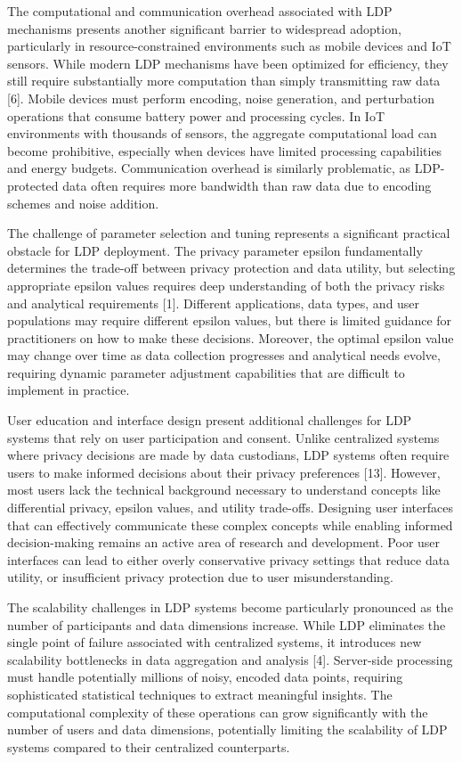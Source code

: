 \documentclass[conference]{IEEEtran}
\begin{document}
The computational and communication overhead associated with LDP mechanisms presents another significant barrier to widespread adoption, particularly in resource-constrained environments such as mobile devices and IoT sensors. While modern LDP mechanisms have been optimized for efficiency, they still require substantially more computation than simply transmitting raw data [6]. Mobile devices must perform encoding, noise generation, and perturbation operations that consume battery power and processing cycles. In IoT environments with thousands of sensors, the aggregate computational load can become prohibitive, especially when devices have limited processing capabilities and energy budgets. Communication overhead is similarly problematic, as LDP-protected data often requires more bandwidth than raw data due to encoding schemes and noise addition.

The challenge of parameter selection and tuning represents a significant practical obstacle for LDP deployment. The privacy parameter epsilon fundamentally determines the trade-off between privacy protection and data utility, but selecting appropriate epsilon values requires deep understanding of both the privacy risks and analytical requirements [1]. Different applications, data types, and user populations may require different epsilon values, but there is limited guidance for practitioners on how to make these decisions. Moreover, the optimal epsilon value may change over time as data collection progresses and analytical needs evolve, requiring dynamic parameter adjustment capabilities that are difficult to implement in practice.

User education and interface design present additional challenges for LDP systems that rely on user participation and consent. Unlike centralized systems where privacy decisions are made by data custodians, LDP systems often require users to make informed decisions about their privacy preferences [13]. However, most users lack the technical background necessary to understand concepts like differential privacy, epsilon values, and utility trade-offs. Designing user interfaces that can effectively communicate these complex concepts while enabling informed decision-making remains an active area of research and development. Poor user interfaces can lead to either overly conservative privacy settings that reduce data utility, or insufficient privacy protection due to user misunderstanding.

The scalability challenges in LDP systems become particularly pronounced as the number of participants and data dimensions increase. While LDP eliminates the single point of failure associated with centralized systems, it introduces new scalability bottlenecks in data aggregation and analysis [4]. Server-side processing must handle potentially millions of noisy, encoded data points, requiring sophisticated statistical techniques to extract meaningful insights. The computational complexity of these operations can grow significantly with the number of users and data dimensions, potentially limiting the scalability of LDP systems compared to their centralized counterparts.
\end{document}

